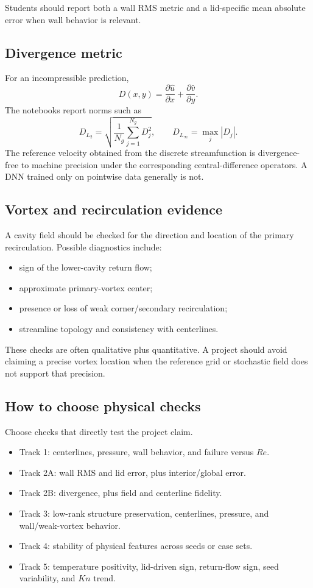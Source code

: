 \documentclass[11pt]{article}
\begin{document}
Students should report both a wall RMS metric and a lid-specific mean absolute error when wall behavior is relevant.

\subsection{Divergence metric}
For an incompressible prediction,
\[
D(x,y)=\frac{\partial \hat u}{\partial x}
+\frac{\partial \hat v}{\partial y}.
\]
The notebooks report norms such as
\[
D_{L_2}=
\sqrt{\frac{1}{N_g}\sum_{j=1}^{N_g}D_j^2},
\qquad
D_{L_\infty}=\max_j|D_j|.
\]
The reference velocity obtained from the discrete streamfunction is divergence-free to machine precision under the corresponding central-difference operators. A DNN trained only on pointwise data generally is not.

\subsection{Vortex and recirculation evidence}
A cavity field should be checked for the direction and location of the primary recirculation. Possible diagnostics include:
\begin{itemize}
\item sign of the lower-cavity return flow;
\item approximate primary-vortex center;
\item presence or loss of weak corner/secondary recirculation;
\item streamline topology and consistency with centerlines.
\end{itemize}
These checks are often qualitative plus quantitative. A project should avoid claiming a precise vortex location when the reference grid or stochastic field does not support that precision.

\subsection{How to choose physical checks}
Choose checks that directly test the project claim.
\begin{itemize}
\item Track 1: centerlines, pressure, wall behavior, and failure versus $Re$.
\item Track 2A: wall RMS and lid error, plus interior/global error.
\item Track 2B: divergence, plus field and centerline fidelity.
\item Track 3: low-rank structure preservation, centerlines, pressure, and wall/weak-vortex behavior.
\item Track 4: stability of physical features across seeds or case sets.
\item Track 5: temperature positivity, lid-driven sign, return-flow sign, seed variability, and $Kn$ trend.
\end{itemize}
\end{document}
